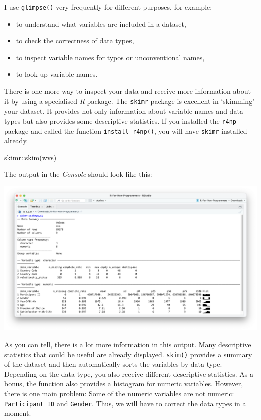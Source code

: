 \documentclass[
  letterpaper,
  DIV=11,
  numbers=noendperiod]{scrreprt}
\newenvironment{Shaded}{\begin{snugshade}}{\end{snugshade}}
\newcommand{\FunctionTok}[1]{\textcolor[rgb]{0.28,0.35,0.67}{#1}}
\newcommand{\NormalTok}[1]{\textcolor[rgb]{0.00,0.23,0.31}{#1}}
\newcommand{\SpecialCharTok}[1]{\textcolor[rgb]{0.37,0.37,0.37}{#1}}
\begin{document}
I use \texttt{glimpse()} very frequently for different purposes, for
example:

\begin{itemize}
\item
  to understand what variables are included in a dataset,
\item
  to check the correctness of data types,
\item
  to inspect variable names for typos or unconventional names,
\item
  to look up variable names.
\end{itemize}

There is one more way to inspect your data and receive more information
about it by using a specialised \emph{R} package. The \texttt{skimr}
package is excellent in `skimming' your dataset. It provides not only
information about variable names and data types but also provides some
descriptive statistics. If you installed the \texttt{r4np} package and
called the function \texttt{install\_r4np()}, you will have
\texttt{skimr} installed already.

\begin{Shaded}
\begin{Highlighting}[]
\NormalTok{skimr}\SpecialCharTok{::}\FunctionTok{skim}\NormalTok{(wvs)}
\end{Highlighting}
\end{Shaded}

The output in the \emph{Console} should look like this:

\includegraphics{images/chapter_07_img/02_skimr_output/skimr_output.png}

As you can tell, there is a lot more information in this output. Many
descriptive statistics that could be useful are already displayed.
\texttt{skim()} provides a summary of the dataset and then automatically
sorts the variables by data type. Depending on the data type, you also
receive different descriptive statistics. As a bonus, the function also
provides a histogram for numeric variables. However, there is one main
problem: Some of the numeric variables are not numeric:
\texttt{Participant\ ID} and \texttt{Gender}. Thus, we will have to
correct the data types in a moment.
\end{document}
